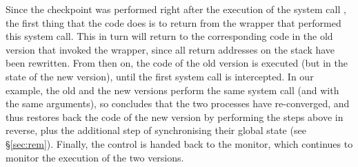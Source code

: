 Since the checkpoint was performed right after the execution of the system
call , the first thing that the code does is to
return from the  wrapper that performed this system
call.  This in turn will return to the corresponding code in the old
version that invoked the wrapper, since all return addresses on the
stack have been rewritten.  From then on, the code of the old version
is executed (but in the state of the new version), until the first
system call is intercepted.  In our example, the old and the new
versions perform the same system call (and with the same arguments),
so \rem concludes that the two processes have re-converged, and thus
restores back the code of the new version by performing the steps
above in reverse, plus the additional step of synchronising their
global state (see \S\ref{sec:rem}).  Finally, the control is handed
back to the \mxm monitor, which continues to monitor the execution of
the two versions.


